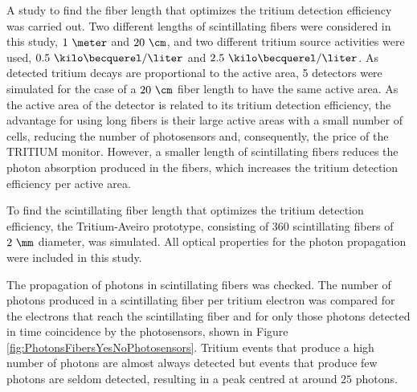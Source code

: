 A study to find the fiber length that optimizes the tritium detection efficiency was carried out. Two different lengths of scintillating fibers were considered in this study, $1~\meter$ and $20~\cm$, and two different tritium source activities were used, $0.5~\kilo\becquerel/\liter$ and $2.5~\kilo\becquerel/\liter$. As detected tritium decays are proportional to the active area, 5 detectors were simulated for the case of a $20~\cm$ fiber length to have the same active area. As the active area of the detector is related to its tritium detection efficiency, the advantage for using long fibers is their large active areas with a small number of cells, reducing the number of photosensors and, consequently, the price of the TRITIUM monitor. However, a smaller length of scintillating fibers reduces the photon absorption produced in the fibers, which increases the tritium detection efficiency per active area.

To find the scintillating fiber length that optimizes the tritium detection efficiency, the Tritium-Aveiro prototype, consisting of $360$ scintillating fibers of $2~\mm$ diameter, was simulated. All optical properties for the photon propagation were included in this study. 

The propagation of photons in scintillating fibers was checked. The number of photons produced in a scintillating fiber per tritium electron was compared for the electrons that reach the scintillating fiber and for only those photons detected in time coincidence by the photosensors, shown in Figure \ref{fig:PhotonsFibersYesNoPhotosensors}. Tritium events that produce a high number of photons are almost always detected but events that produce few photons are seldom detected, resulting in a peak centred at around $25$ photons.  

